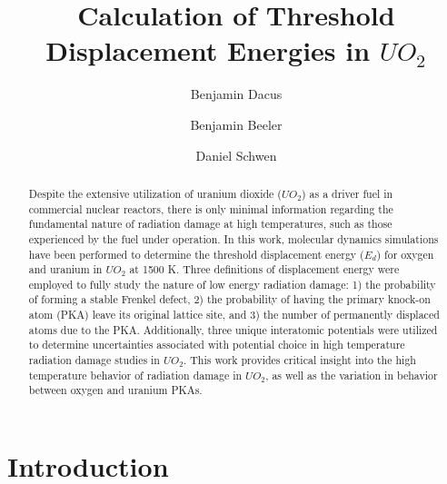 \documentclass[8pt]{article}   	%
\title{Calculation of Threshold Displacement Energies in $UO_2$}
\author[1]{Benjamin Dacus}
\author[2]{Benjamin Beeler}
\author[2]{Daniel Schwen}
\affil[1]{North Carolina State University, Raleigh, NC 27695}
\affil[2]{Idaho National Laboratory, Idaho Falls, ID 83415}
\begin{document}

\begin{@twocolumnfalse}
\maketitle
    \begin{abstract}
      Despite the extensive utilization of uranium dioxide ($UO_2$) as a driver fuel in commercial nuclear reactors, there is only minimal information regarding the fundamental nature of radiation damage at high temperatures, such as those experienced by the fuel under operation. In this work, molecular dynamics simulations have been performed to determine the threshold displacement energy ($E_d$) for oxygen and uranium in $UO_2$ at 1500 K. Three definitions of displacement energy were employed to fully study the nature of low energy radiation damage: 1) the probability of forming a stable Frenkel defect, 2) the probability of having the primary knock-on atom (PKA) leave its original lattice site, and 3) the number of permanently displaced atoms due to the PKA. Additionally, three unique interatomic potentials were utilized to determine uncertainties associated with potential choice in high temperature radiation damage studies in $UO_2$. This work provides critical insight into the high temperature behavior of radiation damage in $UO_2$, as well as the variation in behavior between oxygen and uranium PKAs.
    \end{abstract}
\end{@twocolumnfalse}


\clearpage
\newpage

\section{Introduction}
\end{document}
